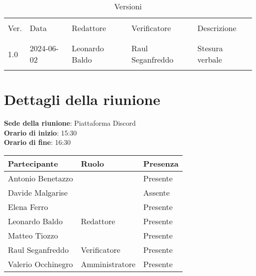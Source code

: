 \documentclass[italian,12pt]{article}
\begin{document}


\newpage



\begin{table}[!h]
	\caption{Versioni}
	\footnotesize
	\begin{center}
		\begin{tabular}{ l l l l l }
			\hline                                                             \\[-2ex]
			Ver. & Data       & Redattore   & Verificatore   & Descrizione     \\
			\\[-2ex] \hline \\[-1.5ex]
			1.0  & 2024-06-02 & Leonardo Baldo & Raul Seganfreddo & Stesura verbale \\
			\\[-1.5ex] \hline
		\end{tabular}
	\end{center}
\end{table}

\newpage

\tableofcontents

\newpage

\section{Dettagli della riunione}


\textbf{Sede della riunione}: Piattaforma Discord\\
\textbf{Orario di inizio}: 15:30\\
\textbf{Orario di fine}: 16:30\\


\begin{flushleft}
	\begin{table}[!h]
		\begin{tabular}{ |l|l|l| }
			\hline
			\textbf{Partecipante} & \textbf{Ruolo} & \textbf{Presenza} \\
			\hline
			Antonio Benetazzo     &                & Presente          \\
			Davide Malgarise      &                & Assente           \\
			Elena Ferro           &                & Presente          \\
			Leonardo Baldo        & Redattore      & Presente          \\
			Matteo Tiozzo         &                & Presente          \\
			Raul Seganfreddo      & Verificatore   & Presente          \\
			Valerio Occhinegro    & Amministratore & Presente          \\
			\hline
		\end{tabular}
	\end{table}
\end{flushleft}
\end{document}
